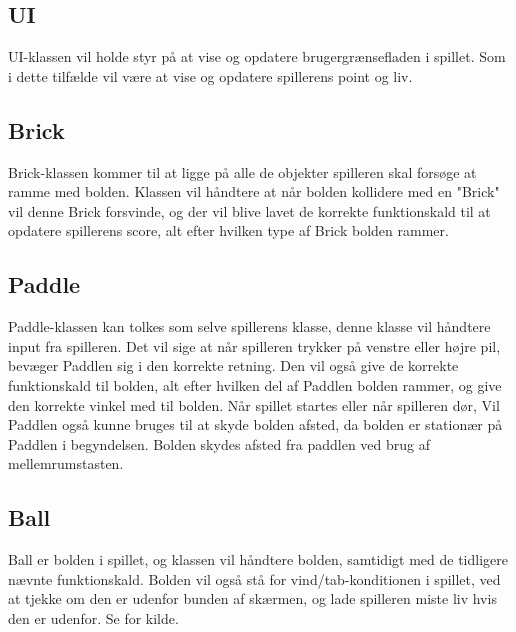 \subsection{UI}
UI-klassen vil holde styr på at vise og opdatere brugergrænsefladen i spillet. 
Som i dette tilfælde vil være at vise og opdatere spillerens point og liv.

\subsection{Brick}
Brick-klassen kommer til at ligge på alle de objekter spilleren skal forsøge at ramme med bolden. Klassen vil håndtere at når bolden kollidere med en "Brick" vil denne Brick forsvinde, og der vil blive lavet de korrekte funktionskald til at opdatere spillerens score, alt efter hvilken type af Brick bolden rammer.

\subsection{Paddle}
Paddle-klassen kan tolkes som selve spillerens klasse, denne klasse vil håndtere input fra spilleren. Det vil sige at når spilleren trykker på venstre eller højre pil, bevæger Paddlen sig i den korrekte retning. Den vil også give de korrekte funktionskald til bolden, alt efter hvilken del af Paddlen bolden rammer, og give den korrekte vinkel med til bolden. Når spillet startes eller når spilleren dør, Vil Paddlen også kunne bruges til at skyde bolden afsted, da bolden er stationær på Paddlen i begyndelsen. Bolden skydes afsted fra paddlen ved brug af mellemrumstasten. 

\subsection{Ball}
Ball er bolden i spillet, og klassen vil håndtere bolden, samtidigt med de tidligere nævnte funktionskald. Bolden vil også stå for vind/tab-konditionen i spillet, ved at tjekke om den er udenfor bunden af skærmen, og lade spilleren miste liv hvis den er udenfor.\newline
\newline
Se \cite[chap. 4]{Mathiassen200006} for kilde.


